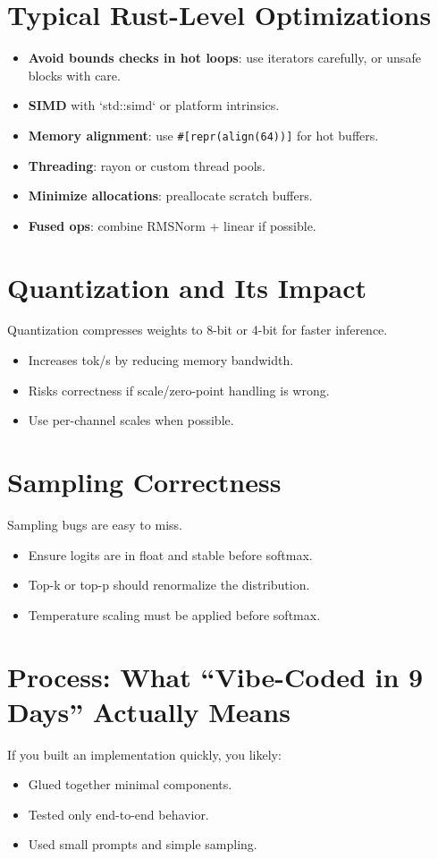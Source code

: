 \documentclass[11pt]{article}
\begin{document}
\section{Typical Rust-Level Optimizations}
\begin{itemize}
  \item \textbf{Avoid bounds checks in hot loops}: use iterators carefully, or unsafe blocks with care.
  \item \textbf{SIMD} with `std::simd` or platform intrinsics.
  \item \textbf{Memory alignment}: use \texttt{\#[repr(align(64))]} for hot buffers.
  \item \textbf{Threading}: rayon or custom thread pools.
  \item \textbf{Minimize allocations}: preallocate scratch buffers.
  \item \textbf{Fused ops}: combine RMSNorm + linear if possible.
\end{itemize}

\section{Quantization and Its Impact}
Quantization compresses weights to 8-bit or 4-bit for faster inference.
\begin{itemize}
  \item Increases tok/s by reducing memory bandwidth.
  \item Risks correctness if scale/zero-point handling is wrong.
  \item Use per-channel scales when possible.
\end{itemize}

\section{Sampling Correctness}
Sampling bugs are easy to miss.
\begin{itemize}
  \item Ensure logits are in float and stable before softmax.
  \item Top-k or top-p should renormalize the distribution.
  \item Temperature scaling must be applied before softmax.
\end{itemize}

\section{Process: What ``Vibe-Coded in 9 Days'' Actually Means}
If you built an implementation quickly, you likely:
\begin{itemize}
  \item Glued together minimal components.
  \item Tested only end-to-end behavior.
  \item Used small prompts and simple sampling.
\end{itemize}
\end{document}
